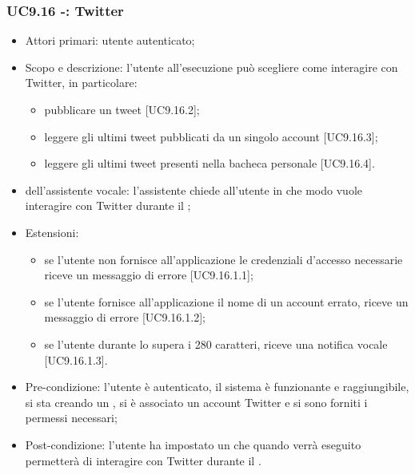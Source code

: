 \subsubsection{UC9.16 -: Twitter}
\begin{itemize}
	\item  Attori primari: utente autenticato;
	\item  Scopo e descrizione: l'utente all'esecuzione può scegliere come interagire con Twitter, in particolare:
		   \begin{itemize}
				\item pubblicare un tweet [UC9.16.2];
				\item leggere gli ultimi tweet pubblicati da un singolo account [UC9.16.3];
				\item leggere gli ultimi tweet presenti nella bacheca personale [UC9.16.4].
		   \end{itemize}
	\item  {} dell'assistente vocale: l'assistente chiede all'utente in che modo vuole interagire con Twitter durante il ;
	\item  Estensioni: 
		   \begin{itemize}
				\item se l'utente non fornisce all'applicazione le credenziali d'accesso necessarie riceve un messaggio di errore [UC9.16.1.1];
				\item se l'utente fornisce all'applicazione il nome di un account errato, riceve un messaggio di errore [UC9.16.1.2];
				\item se l'utente durante lo  supera i 280 caratteri, riceve una notifica vocale [UC9.16.1.3].
		   \end{itemize}
	\item  Pre-condizione: l'utente è autenticato, il sistema è funzionante e raggiungibile, si sta creando un , si è associato un account Twitter e si sono forniti i permessi necessari;
	\item  Post-condizione: l'utente ha impostato un  che quando verrà eseguito permetterà di interagire con Twitter durante il .
\end{itemize}

